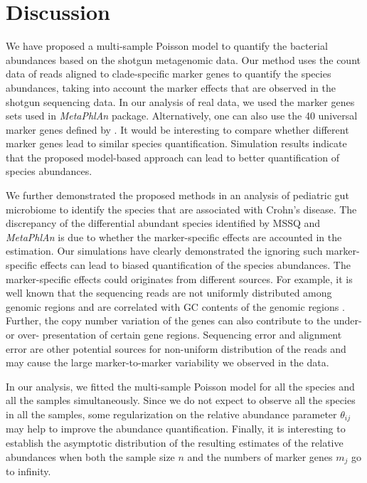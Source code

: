\section{Discussion}
We have proposed a multi-sample Poisson model to quantify the bacterial abundances based on the shotgun metagenomic data.  Our method uses the count data of reads  aligned to clade-specific  marker genes  to quantify  the species abundances,  taking into account the marker effects that are observed in the shotgun sequencing data. In our analysis of real data, we used the marker genes sets used in  {\it MetaPhlAn} package.  Alternatively, one can also use the 40 universal marker genes defined by \cite{Sunagawa:2013if}. It would be interesting to compare whether different marker genes lead to similar species quantification. 
Simulation results indicate that the proposed model-based approach can lead to better quantification of species abundances.

We further demonstrated the proposed methods in an analysis of pediatric gut microbiome to identify the species that are associated with Crohn's disease. The discrepancy of the differential abundant species identified by MSSQ and {\it MetaPhlAn} is due to whether the marker-specific effects are accounted in the estimation. Our simulations have clearly demonstrated the ignoring such marker-specific effects can lead to biased quantification of the species abundances. The marker-specific effects could originates  from different sources. For example, it is well known that the sequencing reads are not uniformly distributed among genomic regions and are correlated with GC contents of the genomic regions \citep{ross2013characterizing}. Further, the copy number variation of the genes can also contribute to the under- or over- presentation of certain gene regions. Sequencing error and alignment error are other potential sources for non-uniform distribution of the reads and may cause the large  marker-to-marker variability we observed in the data. 

In our analysis, we fitted the multi-sample Poisson model for all the species and all the samples simultaneously. Since we do not expect to observe all the species in all the samples,  some regularization on the relative abundance parameter $\theta_{ij}$ may help to improve  the abundance quantification. Finally, it is interesting to establish the asymptotic distribution of the resulting estimates of the relative abundances when both the sample size $n$ and the numbers of marker genes $m_j$ go to infinity. 
